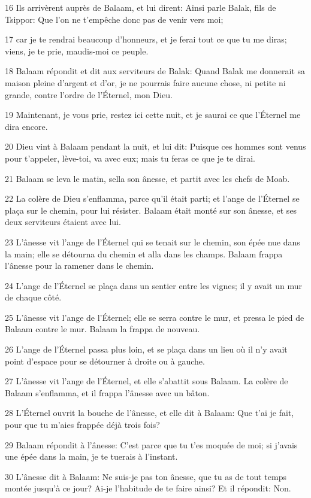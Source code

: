 \par 16 Ils arrivèrent auprès de Balaam, et lui dirent: Ainsi parle Balak, fils de Tsippor: Que l'on ne t'empêche donc pas de venir vers moi;
\par 17 car je te rendrai beaucoup d'honneurs, et je ferai tout ce que tu me diras; viens, je te prie, maudis-moi ce peuple.
\par 18 Balaam répondit et dit aux serviteurs de Balak: Quand Balak me donnerait sa maison pleine d'argent et d'or, je ne pourrais faire aucune chose, ni petite ni grande, contre l'ordre de l'Éternel, mon Dieu.
\par 19 Maintenant, je vous prie, restez ici cette nuit, et je saurai ce que l'Éternel me dira encore.
\par 20 Dieu vint à Balaam pendant la nuit, et lui dit: Puisque ces hommes sont venus pour t'appeler, lève-toi, va avec eux; mais tu feras ce que je te dirai.
\par 21 Balaam se leva le matin, sella son ânesse, et partit avec les chefs de Moab.
\par 22 La colère de Dieu s'enflamma, parce qu'il était parti; et l'ange de l'Éternel se plaça sur le chemin, pour lui résister. Balaam était monté sur son ânesse, et ses deux serviteurs étaient avec lui.
\par 23 L'ânesse vit l'ange de l'Éternel qui se tenait sur le chemin, son épée nue dans la main; elle se détourna du chemin et alla dans les champs. Balaam frappa l'ânesse pour la ramener dans le chemin.
\par 24 L'ange de l'Éternel se plaça dans un sentier entre les vignes; il y avait un mur de chaque côté.
\par 25 L'ânesse vit l'ange de l'Éternel; elle se serra contre le mur, et pressa le pied de Balaam contre le mur. Balaam la frappa de nouveau.
\par 26 L'ange de l'Éternel passa plus loin, et se plaça dans un lieu où il n'y avait point d'espace pour se détourner à droite ou à gauche.
\par 27 L'ânesse vit l'ange de l'Éternel, et elle s'abattit sous Balaam. La colère de Balaam s'enflamma, et il frappa l'ânesse avec un bâton.
\par 28 L'Éternel ouvrit la bouche de l'ânesse, et elle dit à Balaam: Que t'ai je fait, pour que tu m'aies frappée déjà trois fois?
\par 29 Balaam répondit à l'ânesse: C'est parce que tu t'es moquée de moi; si j'avais une épée dans la main, je te tuerais à l'instant.
\par 30 L'ânesse dit à Balaam: Ne suis-je pas ton ânesse, que tu as de tout temps montée jusqu'à ce jour? Ai-je l'habitude de te faire ainsi? Et il répondit: Non.

